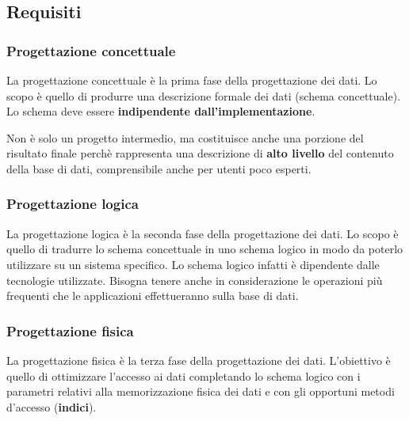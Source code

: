 \documentclass[a4paper]{article}
\begin{document}
\subsection{Requisiti}
\subsubsection{Progettazione concettuale}
La progettazione concettuale è la prima fase della progettazione dei dati. Lo scopo è
quello di produrre una descrizione formale dei dati (schema concettuale). Lo schema
deve essere \textbf{indipendente dall'implementazione}.

\vspace{1em}
\noindent
Non è solo un progetto intermedio, ma costituisce anche una porzione del risultato finale
perchè rappresenta una descrizione di \textbf{alto livello} del contenuto della base di
dati, comprensibile anche per utenti poco esperti.

\subsubsection{Progettazione logica}
La progettazione logica è la seconda fase della progettazione dei dati. Lo scopo è
quello di tradurre lo schema concettuale in uno schema logico in modo da poterlo
utilizzare su un sistema specifico. Lo schema logico infatti è dipendente dalle
tecnologie utilizzate. Bisogna tenere anche in considerazione le operazioni più
frequenti che le applicazioni effettueranno sulla base di dati.

\subsubsection{Progettazione fisica}
La progettazione fisica è la terza fase della progettazione dei dati. L'obiettivo è quello
di ottimizzare l'accesso ai dati completando lo schema logico con i parametri relativi
alla memorizzazione fisica dei dati e con gli opportuni metodi d'accesso (\textbf{indici}).
\end{document}
